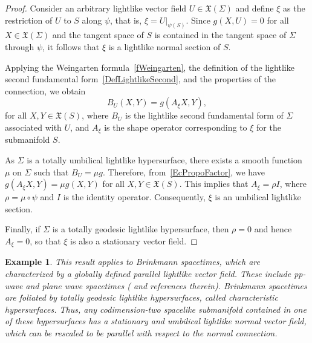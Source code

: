 \documentclass[11pt]{article}
\numberwithin{equation}{section}
\newtheorem{example}[theorem]{Example}
\begin{document}
\begin{proof}
	Consider an arbitrary lightlike vector field $U \in \mathfrak{X}(\Sigma)$ and define $\xi$ as the restriction of $U$ to $S$ along $\psi$, that is, $\xi = U|_{\psi(S)}$. Since $g(X, U) = 0$ for all $X \in \mathfrak{X}(\Sigma)$ and the tangent space of $S$ is contained in the tangent space of $\Sigma$ through $\psi$, it follows that $\xi$ is a lightlike normal section of $S$.
	
	Applying the Weingarten formula~\eqref{fWeingarten}, the definition of the lightlike second fundamental form~\eqref{DefLightlikeSecond}, and the properties of the connection, we obtain
	\begin{equation}\label{EcPropoFactor}
		B_U(X, Y) = g(A_{\xi} X, Y),
	\end{equation}
	for all $X, Y \in \mathfrak{X}(S)$, where $B_U$ is the lightlike second fundamental form of $\Sigma$ associated with $U$, and $A_{\xi}$ is the shape operator corresponding to $\xi$ for the submanifold $S$.
	
	As $\Sigma$ is a totally umbilical lightlike hypersurface, there exists a smooth function $\mu$ on $\Sigma$ such that $B_U = \mu g$. Therefore, from~\eqref{EcPropoFactor}, we have $g(A_{\xi} X, Y) = \mu g(X, Y)$ for all $X, Y \in \mathfrak{X}(S)$. This implies that $A_{\xi} = \rho I$, where $\rho = \mu \circ \psi$ and $I$ is the identity operator. Consequently, $\xi$ is an umbilical lightlike section.
	
	Finally, if $\Sigma$ is a totally geodesic lightlike hypersurface, then $\rho = 0$ and hence $A_\xi = 0$, so that $\xi$ is also a stationary vector field.
\end{proof}
	
	
	
	\begin{example} \normalfont
		This result applies to Brinkmann spacetimes, which are characterized by a globally defined parallel lightlike vector field. These include pp-wave and plane wave spacetimes (\cite{CanovasPalomoRomero} and references therein). Brinkmann spacetimes are foliated by totally geodesic lightlike hypersurfaces, called characteristic hypersurfaces. Thus, any codimension-two spacelike submanifold contained in one of these hypersurfaces has a stationary and umbilical lightlike normal vector field, which can be rescaled to be parallel with respect to the normal connection.
	\end{example}
	
	
	
\end{document}

